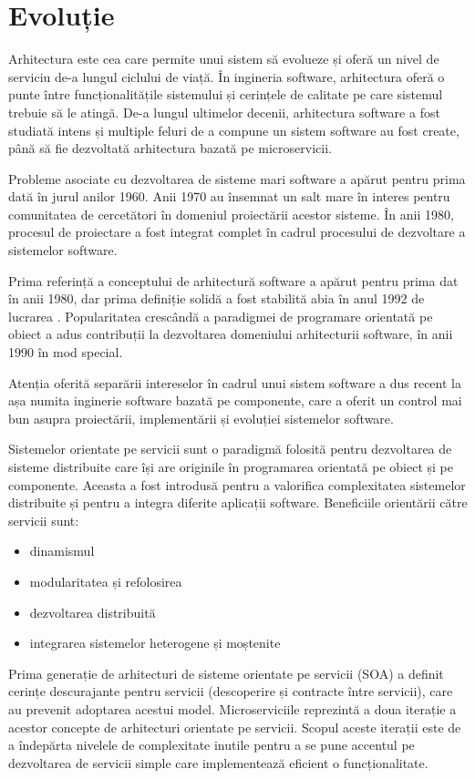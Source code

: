 \documentclass[12pt, a4paper, twocolumn]{article} %
\begin{document}
\section{Evoluție} Arhitectura este cea care permite unui sistem să evolueze și oferă un nivel de serviciu de-a lungul ciclului de viață. În ingineria software, arhitectura oferă o punte între funcționalitățile sistemului și cerințele de calitate pe care sistemul trebuie să le atingă. De-a lungul ultimelor decenii, arhitectura software a fost studiată intens și multiple feluri de a compune un sistem software au fost create, până să fie dezvoltată arhitectura bazată pe microservicii.\par Probleme asociate cu dezvoltarea de sisteme mari software a apărut pentru prima dată în jurul anilor 1960. Anii 1970 au însemnat un salt mare în interes pentru comunitatea de cercetători în domeniul proiectării acestor sisteme. În anii 1980, procesul de proiectare a fost integrat complet în cadrul procesului de dezvoltare a sistemelor software.\par
Prima referință a conceptului de arhitectură software a apărut pentru prima dat în anii 1980, dar prima definiție solidă a fost stabilită abia în anul 1992 de lucrarea \citep{perry1992foundations}. Popularitatea crescândă a paradigmei de programare orientată pe obiect a adus contribuții la dezvoltarea domeniului arhitecturii software, în anii 1990 în mod special.\par
Atenția oferită separării intereselor în cadrul unui sistem software a dus recent la așa numita inginerie software bazată pe componente, care a oferit un control mai bun asupra proiectării, implementării și evoluției sistemelor software.\par
Sistemelor orientate pe servicii sunt o paradigmă folosită pentru dezvoltarea de sisteme distribuite care își are originile în programarea orientată pe obiect și pe componente. Aceasta a fost introdusă pentru a valorifica complexitatea sistemelor distribuite și pentru a integra diferite aplicații software. Beneficiile orientării către servicii sunt:
\begin{itemize}
  \item dinamismul
  \item modularitatea și refolosirea
  \item dezvoltarea distribuită
  \item integrarea sistemelor heterogene și moștenite
\end{itemize}\par
Prima generație de arhitecturi de sisteme orientate pe servicii (SOA) a definit cerințe descurajante pentru servicii (descoperire și contracte între servicii), care au prevenit adoptarea acestui model. Microserviciile reprezintă a doua iterație a acestor concepte de arhitecturi orientate pe servicii. Scopul aceste iterații este de a îndepărta nivelele de complexitate inutile pentru a se pune accentul pe dezvoltarea de servicii simple care implementează eficient o funcționalitate.\par
\end{document}
